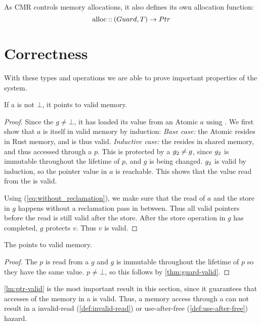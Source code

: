 As CMR controls memory allocations, it also defines its own allocation function:
\begin{equation}\label{eq:alloc}
  \text{alloc\:::\:} (Guard, T) \to Ptr
\end{equation}


\section{Correctness\label{sec:cmr-correctness}}

With these types and operations we are able to prove important properties of the system.

\begin{theorem}\label{thm:guard-valid}
  If a  is not $\bot$, it points to valid memory.
\end{theorem}
\begin{proof}
  Since the  $g \neq \bot$, it has loaded its value from an Atomic $a$ using
  .  We first show that $a$ is itself in valid memory by induction: \emph{Base
  case:} the Atomic resides in Rust memory, and is thus valid. \emph{Inductive case:} the
   resides in shared memory, and thus accessed through a  $p$.  This  is
  protected by a  $g\sb{2} \neq g$, since $g\sb{2}$ is immutable throughout the lifetime
  of $p$, and $g$ is being changed. $g\sb{2}$ is valid by induction, so the pointer value in $a$ is
  reachable. This shows that the value read from the  is valid.

  Using  (\cref{eq:without_reclamation}), we make sure that the read of $a$
  and the store in $g$ happens without a reclamation pass in between. Thus all valid pointers
  before the read is still valid after the store. After the store operation in $g$ has completed,
  $g$ protects $v$. Thus $v$ is valid.
\end{proof}

\begin{lemma}\label{lm:ptr-valid}
  The  points to valid memory.
\end{lemma}
\begin{proof}
  The   $p$ is read from a  $g$ and $g$ is immutable throughout the lifetime of
  $p$ so they have the same value. $p \neq \bot$, so this follows by \cref{thm:guard-valid}.
\end{proof}

\cref{lm:ptr-valid} is the most important result in this section, since it guarantees that
accesses of the memory in a  is valid. Thus, a memory access through a  can not
result in a invalid-read (\cref{def:invalid-read}) or use-after-free (\cref{def:use-after-free})
hazard.
